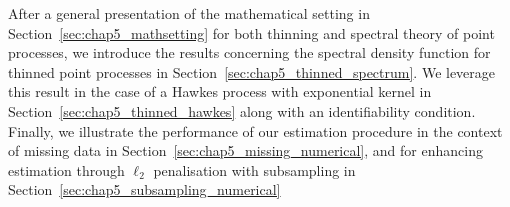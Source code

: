 After a general presentation of the mathematical setting in Section~\ref{sec:chap5_mathsetting} for both thinning and spectral theory of point processes, 
we introduce the results concerning the spectral density function for thinned point processes in Section~\ref{sec:chap5_thinned_spectrum}.
We leverage this result in the case of a Hawkes process with exponential kernel in Section~\ref{sec:chap5_thinned_hawkes} along with an identifiability condition.
Finally, we illustrate the performance of our estimation procedure in the context of missing data in Section~\ref{sec:chap5_missing_numerical}, and for enhancing estimation through $\ell_2$ penalisation with subsampling in Section~\ref{sec:chap5_subsampling_numerical}



    



